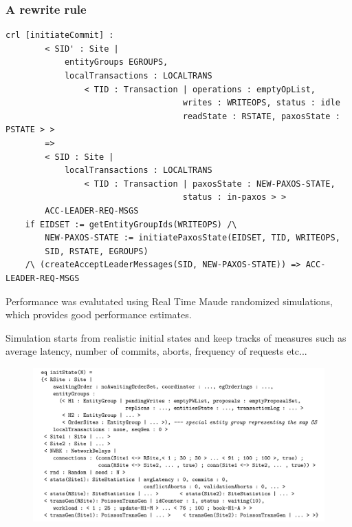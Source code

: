 \documentclass{beamer}
\begin{document}
\begin{frame}[fragile]
    \frametitle{A rewrite rule}
    \scriptsize
    \begin{lstlisting}[language=maude]
    crl [initiateCommit] :
        < SID' : Site |
            entityGroups EGROUPS,
            localTransactions : LOCALTRANS
                < TID : Transaction | operations : emptyOpList,
                                    writes : WRITEOPS, status : idle
                                    readState : RSTATE, paxosState : PSTATE > >
        =>
        < SID : Site |
            localTransactions : LOCALTRANS
                < TID : Transaction | paxosState : NEW-PAXOS-STATE,
                                    status : in-paxos > >
        ACC-LEADER-REQ-MSGS
    if EIDSET := getEntityGroupIds(WRITEOPS) /\
        NEW-PAXOS-STATE := initiatePaxosState(EIDSET, TID, WRITEOPS,
        SID, RSTATE, EGROUPS)
    /\ (createAcceptLeaderMessages(SID, NEW-PAXOS-STATE)) => ACC-LEADER-REQ-MSGS
        \end{lstlisting}
\end{frame}
\begin{frame}
    \scriptsize
    Performance was evalutated using Real Time Maude randomized simulations, which provides good performance estimates.

    
    \bigskip
    Simulation starts from realistic initial states and keep tracks of measures such as 
    average latency, number of commits, aborts, frequency of requests etc...
    \begin{figure}
        \includegraphics[width=\textwidth,height=\textheight,keepaspectratio]{img/init.png}
    \end{figure}
\end{frame}
\end{document}
